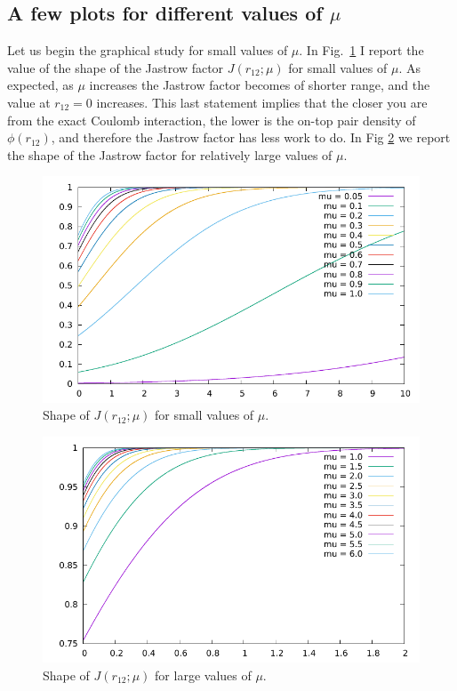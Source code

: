 \documentclass[aip,jcp,reprint,noshowkeys,superscriptaddress]{revtex4-1}
\begin{document}
\subsection{A few plots for different values of $\mu$}
Let us begin the graphical study for small values of $\mu$. In Fig. \ref{fig_small_mu} I report the value of the shape of the Jastrow factor $J(r_{12};\mu)$ for small values of $\mu$. As expected,  as $\mu$ increases the Jastrow factor becomes of shorter range, and the value at $r_{12}=0$ increases. This last statement implies that the closer you are from the exact Coulomb interaction, the lower is the on-top pair density of $\phi(r_{12})$, and therefore the Jastrow factor has less work to do. 
In Fig \ref{fig_large_mu} we report the shape of the Jastrow factor for relatively large values of $\mu$. 
\begin{figure}
 \label{fig_small_mu}
        \includegraphics[width=1.00\linewidth]{small_mu.pdf}
        \caption{Shape of $J(r_{12};\mu)$ for small values of $\mu$.}
\end{figure}
\begin{figure}
 \label{fig_large_mu}
        \includegraphics[width=1.00\linewidth]{large_mu.pdf}
        \caption{Shape of $J(r_{12};\mu)$ for large values of $\mu$.}
\end{figure}
\end{document}
